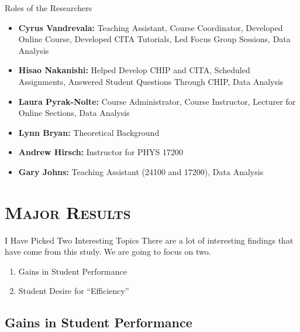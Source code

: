 \documentclass[xcolor=x11names,compress]{beamer}
\begin{document}
\begin{frame}{Roles of the Researchers}
	\begin{itemize}
		\item \textbf{Cyrus Vandrevala:} Teaching Assistant, Course Coordinator, Developed Online Course, Developed CITA Tutorials, Led Focus Group Sessions, Data Analysis
		\vspace{2mm}
		\item \textbf{Hisao Nakanishi:} Helped Develop CHIP and CITA, Scheduled Assignments, Answered Student Questions Through CHIP, Data Analysis
		\vspace{2mm}
		\item \textbf{Laura Pyrak-Nolte:} Course Administrator, Course Instructor, Lecturer for Online Sections, Data Analysis
		\vspace{2mm}
		\item \textbf{Lynn Bryan:} Theoretical Background
		\vspace{2mm}
		\item \textbf{Andrew Hirsch:} Instructor for PHYS 17200
		\vspace{2mm}
		\item \textbf{Gary Johns:} Teaching Assistant (24100 and 17200), Data Analysis
	\end{itemize}
\end{frame}


\section{\scshape Major Results}

\begin{frame}{I Have Picked Two Interesting Topics}
	There are a lot of interesting findings that have come from this study. We are going to focus on two.
	\vspace{3mm}
	\begin{enumerate}
		\item Gains in Student Performance
		\vspace{1mm}
		\item Student Desire for ``Efficiency''
	\end{enumerate}
\end{frame}

\subsection{Gains in Student Performance}
\end{document}
